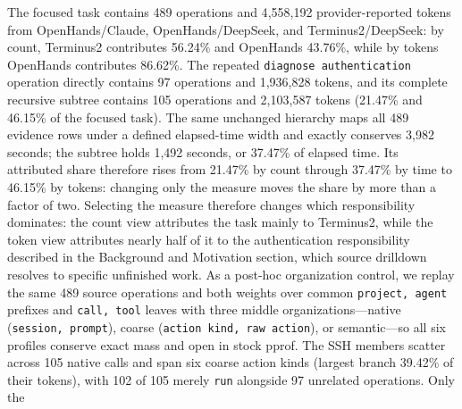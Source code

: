 \documentclass[letterpaper]{article}
\begin{document}
The focused task contains 489 operations and 4{,}558{,}192 provider-reported
tokens from OpenHands/Claude, OpenHands/DeepSeek, and Terminus2/DeepSeek:
by count, Terminus2 contributes 56.24\% and OpenHands 43.76\%, while by tokens
OpenHands contributes 86.62\%. The repeated \texttt{diagnose authentication}
operation directly contains 97 operations and 1{,}936{,}828 tokens, and its
complete recursive subtree contains 105 operations and 2{,}103{,}587 tokens
(21.47\% and 46.15\% of the focused task). The same unchanged hierarchy maps
all 489 evidence rows under a defined elapsed-time width and exactly conserves
3{,}982 seconds; the subtree holds 1{,}492 seconds, or 37.47\% of elapsed time.
Its attributed share therefore rises from 21.47\% by count through 37.47\% by
time to 46.15\% by tokens: changing only the measure moves the share by more
than a factor of two. Selecting the measure therefore
changes which responsibility dominates: the count view attributes the task
mainly to Terminus2, while the token view attributes nearly half of it to the
authentication responsibility described in the Background and Motivation section, which
source drilldown resolves to specific unfinished work.
As a post-hoc organization control, we replay the same 489 source operations and
both weights over common \texttt{project, agent} prefixes and \texttt{call, tool}
leaves with three middle organizations---native (\texttt{session, prompt}), coarse (\texttt{action kind, raw action}), or semantic---so all six profiles conserve
exact mass and open in stock pprof. The SSH members scatter across 105 native
calls and span six coarse action kinds (largest branch 39.42\% of their tokens),
with 102 of 105 merely \texttt{run} alongside 97 unrelated operations. Only the
\end{document}
